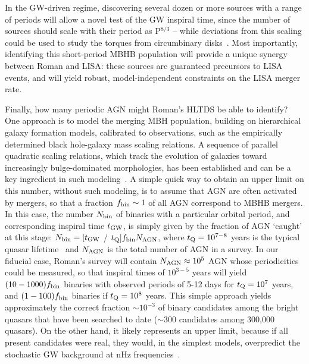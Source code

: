 \documentclass[tightenlines,superscriptaddress,amsmath,amssymb,prl,12pt]{revtex4-1}
\begin{document}
In the GW-driven regime, discovering several dozen or more sources
with a range of periods will allow a novel test of the GW inspiral
time, since the number of sources should scale with their period as
P$^{8/3}$ -- while deviations from this scaling could be used to study
the torques from circumbinary disks~\cite{Haiman+2009}. Most
importantly, identifying this short-period MBHB population will
provide a unique synergy between Roman and LISA: these sources are
guaranteed precursors to LISA events, and will yield robust,
model-independent constraints on the LISA merger rate.

Finally, how many periodic AGN might Roman's HLTDS be able to
identify?  One approach is to model the merging MBH population,
building on hierarchical galaxy formation models, calibrated to
observations, such as the empirically determined black hole-galaxy
mass scaling relations.  A sequence of parallel quadratic scaling
relations, which track the evolution of galaxies toward increasingly
bulge-dominated morphologies, has been established and can be a key
ingredient in such modeling~\cite{2023MNRAS.522.3588G}.  A simple
quick way to obtain an upper limit on this number, without such
modeling, is to assume that AGN are often activated by mergers, so
that a fraction $f_{\rm bin}\sim1$ of all AGN correspond to MBHB
mergers.  In this case, the number $N_{\rm bin}$ of binaries with a
particular orbital period, and corresponding inspiral time $t_{\rm
  GW}$, is simply given by the fraction of AGN `caught' at this stage:
$N_{\rm bin}=[t_{\rm GW}$ / $t_{\rm Q}] f_{\rm bin} N_{\rm AGN}$,
where $t_{\rm Q}=10^{7-8}$ years is the typical quasar
lifetime~\cite{Martini2004} and $N_{\rm AGN}$ is the total number of
AGN in a survey.  In our fiducial case, Roman's survey will contain
$N_{\rm AGN}\approx10^5$ AGN whose periodicities could be measured, so
that inspiral times of $10^{3-5}$ years will yield $(10-1000) f_{\rm
  bin}$ binaries with observed periods of 5-12 days for $t_{\rm
  Q}=10^{7}$ years, and $(1-100) f_{\rm bin}$ binaries if $t_{\rm
  Q}=10^{8}$ years.  This simple approach yields approximately the
correct fraction $\sim10^{-3}$ of binary candidates among the bright
quasars that have been searched to date ($\sim 300$ candidates among
300,000 quasars). On the other hand, it likely represents an upper
limit, because if all present candidates were real, they would, in the
simplest models, overpredict the stochastic GW background at nHz
frequencies~\cite{Sesana+2018}.
\end{document}
